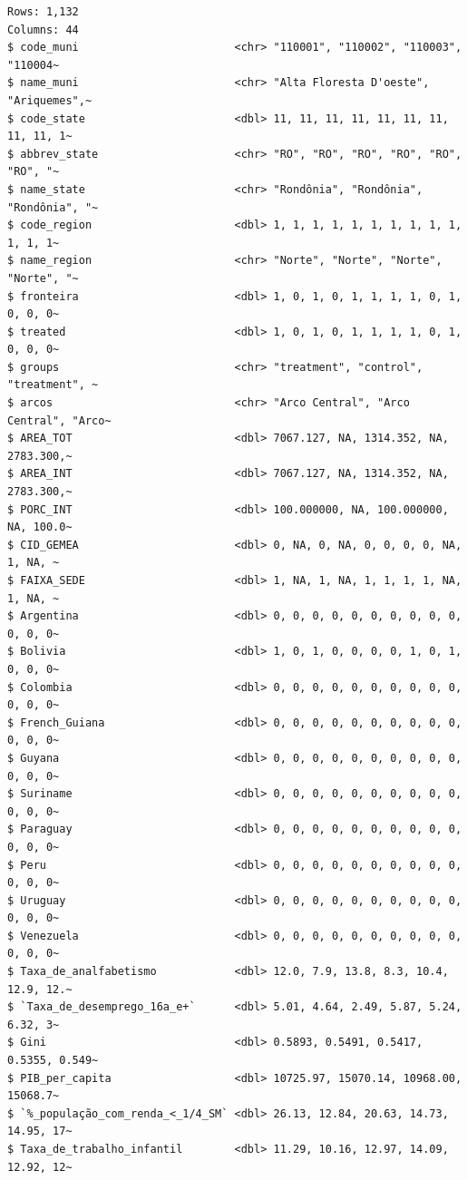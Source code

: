 \documentclass[
  letterpaper,
  DIV=11,
  numbers=noendperiod]{scrartcl}
\begin{document}
\begin{verbatim}
Rows: 1,132
Columns: 44
$ code_muni                        <chr> "110001", "110002", "110003", "110004~
$ name_muni                        <chr> "Alta Floresta D'oeste", "Ariquemes",~
$ code_state                       <dbl> 11, 11, 11, 11, 11, 11, 11, 11, 11, 1~
$ abbrev_state                     <chr> "RO", "RO", "RO", "RO", "RO", "RO", "~
$ name_state                       <chr> "Rondônia", "Rondônia", "Rondônia", "~
$ code_region                      <dbl> 1, 1, 1, 1, 1, 1, 1, 1, 1, 1, 1, 1, 1~
$ name_region                      <chr> "Norte", "Norte", "Norte", "Norte", "~
$ fronteira                        <dbl> 1, 0, 1, 0, 1, 1, 1, 1, 0, 1, 0, 0, 0~
$ treated                          <dbl> 1, 0, 1, 0, 1, 1, 1, 1, 0, 1, 0, 0, 0~
$ groups                           <chr> "treatment", "control", "treatment", ~
$ arcos                            <chr> "Arco Central", "Arco Central", "Arco~
$ AREA_TOT                         <dbl> 7067.127, NA, 1314.352, NA, 2783.300,~
$ AREA_INT                         <dbl> 7067.127, NA, 1314.352, NA, 2783.300,~
$ PORC_INT                         <dbl> 100.000000, NA, 100.000000, NA, 100.0~
$ CID_GEMEA                        <dbl> 0, NA, 0, NA, 0, 0, 0, 0, NA, 1, NA, ~
$ FAIXA_SEDE                       <dbl> 1, NA, 1, NA, 1, 1, 1, 1, NA, 1, NA, ~
$ Argentina                        <dbl> 0, 0, 0, 0, 0, 0, 0, 0, 0, 0, 0, 0, 0~
$ Bolivia                          <dbl> 1, 0, 1, 0, 0, 0, 0, 1, 0, 1, 0, 0, 0~
$ Colombia                         <dbl> 0, 0, 0, 0, 0, 0, 0, 0, 0, 0, 0, 0, 0~
$ French_Guiana                    <dbl> 0, 0, 0, 0, 0, 0, 0, 0, 0, 0, 0, 0, 0~
$ Guyana                           <dbl> 0, 0, 0, 0, 0, 0, 0, 0, 0, 0, 0, 0, 0~
$ Suriname                         <dbl> 0, 0, 0, 0, 0, 0, 0, 0, 0, 0, 0, 0, 0~
$ Paraguay                         <dbl> 0, 0, 0, 0, 0, 0, 0, 0, 0, 0, 0, 0, 0~
$ Peru                             <dbl> 0, 0, 0, 0, 0, 0, 0, 0, 0, 0, 0, 0, 0~
$ Uruguay                          <dbl> 0, 0, 0, 0, 0, 0, 0, 0, 0, 0, 0, 0, 0~
$ Venezuela                        <dbl> 0, 0, 0, 0, 0, 0, 0, 0, 0, 0, 0, 0, 0~
$ Taxa_de_analfabetismo            <dbl> 12.0, 7.9, 13.8, 8.3, 10.4, 12.9, 12.~
$ `Taxa_de_desemprego_16a_e+`      <dbl> 5.01, 4.64, 2.49, 5.87, 5.24, 6.32, 3~
$ Gini                             <dbl> 0.5893, 0.5491, 0.5417, 0.5355, 0.549~
$ PIB_per_capita                   <dbl> 10725.97, 15070.14, 10968.00, 15068.7~
$ `%_população_com_renda_<_1/4_SM` <dbl> 26.13, 12.84, 20.63, 14.73, 14.95, 17~
$ Taxa_de_trabalho_infantil        <dbl> 11.29, 10.16, 12.97, 14.09, 12.92, 12~

\end{verbatim}
\end{document}

